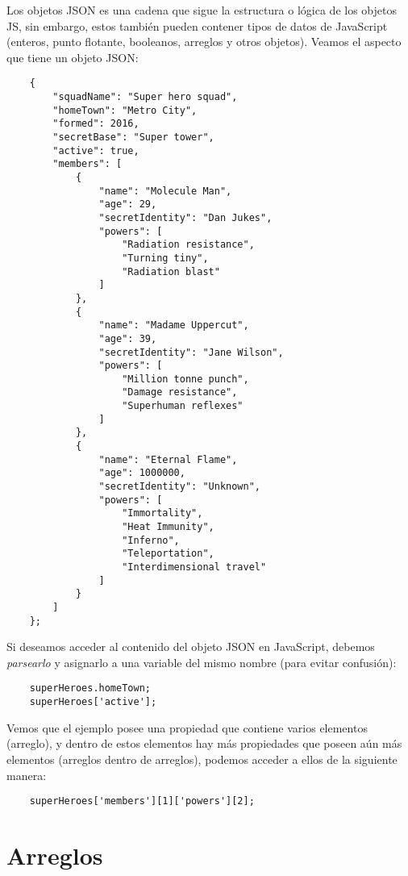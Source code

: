 Los objetos JSON es una cadena que sigue la estructura o lógica de los objetos JS, sin embargo, estos también pueden contener tipos de datos de JavaScript (enteros, punto flotante, booleanos, arreglos y otros objetos). Veamos el aspecto que tiene un objeto JSON:
\begin{lstlisting}
    {
        "squadName": "Super hero squad",
        "homeTown": "Metro City",
        "formed": 2016,
        "secretBase": "Super tower",
        "active": true,
        "members": [
            {
                "name": "Molecule Man",
                "age": 29,
                "secretIdentity": "Dan Jukes",
                "powers": [
                    "Radiation resistance",
                    "Turning tiny",
                    "Radiation blast"
                ]
            },
            {
                "name": "Madame Uppercut",
                "age": 39,
                "secretIdentity": "Jane Wilson",
                "powers": [
                    "Million tonne punch",
                    "Damage resistance",
                    "Superhuman reflexes"
                ]
            },
            {
                "name": "Eternal Flame",
                "age": 1000000,
                "secretIdentity": "Unknown",
                "powers": [
                    "Immortality",
                    "Heat Immunity",
                    "Inferno",
                    "Teleportation",
                    "Interdimensional travel"
                ]
            }
        ]
    };
\end{lstlisting}

Si deseamos acceder al contenido del objeto JSON en JavaScript, debemos \textit{parsearlo} y asignarlo a una variable del mismo nombre (para evitar confusión):
\begin{lstlisting}
    superHeroes.homeTown;
    superHeroes['active'];
\end{lstlisting}

Vemos que el ejemplo posee una propiedad que contiene varios elementos (arreglo), y dentro de estos elementos hay más propiedades que poseen aún más elementos (arreglos dentro de arreglos), podemos acceder a ellos de la siguiente manera:
\begin{lstlisting}
    superHeroes['members'][1]['powers'][2];
\end{lstlisting}



\section{Arreglos}

